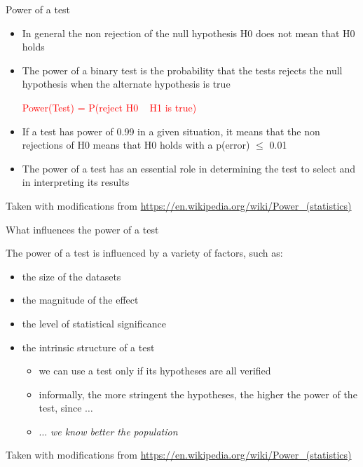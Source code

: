 \documentclass{beamer}
\begin{document}
\begin{frame}
{\centerline{Power of a test}}

\begin{itemize}
    \item In general the non rejection of the null hypothesis H0 does not mean that H0 holds
    \item The power of a binary test is the probability that the tests rejects the null hypothesis when the alternate hypothesis is true\\
    \begin{center}
    \textcolor{red}{Power(Test) = P(reject H0 \textbar~ H1 is true)}
    \end{center}
    \item If a test has power of 0.99 in a given situation, it means that the non rejections of H0 means that H0 holds with a p(error) $\leq$ 0.01
    \item The power of a test has an essential role in determining the test to select and in interpreting its results
\end{itemize}

\begin{center}
\tiny{Taken with modifications from \url{https://en.wikipedia.org/wiki/Power_(statistics)}}
\end{center}

\end{frame}

\begin{frame}
{\centerline{What influences the power of a test}}

The power of a test is influenced by a variety of factors, such as:
\begin{itemize}
    \item the size of the datasets
    \item the magnitude of the effect
    \item the level of statistical significance
    \item the intrinsic structure of a test
    \begin{itemize}
        \item we can use a test only if its hypotheses are all verified
        \item informally, the more stringent the hypotheses, the higher the power of the test, since $\ldots$
        \item $\ldots$ \textit{we know better the population}
    \end{itemize}

\end{itemize}

\begin{center}
\tiny{Taken with modifications from \url{https://en.wikipedia.org/wiki/Power_(statistics)}}
\end{center}

\end{frame}
\end{document}
